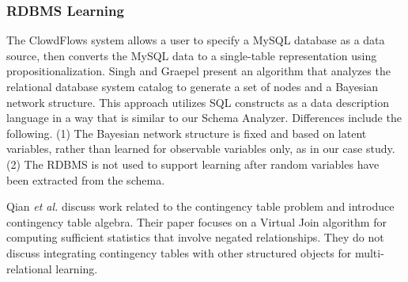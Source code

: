 \documentclass{IEEEtran}
\begin{document}
\subsubsection{RDBMS Learning}
The ClowdFlows system \cite{Lavravc2014} allows a user to specify a MySQL database as a data source, then converts the MySQL data to a single-table representation using propositionalization. 
Singh and Graepel \cite{Singh2013} present an algorithm that analyzes the relational database system catalog to generate a set of nodes and a Bayesian network structure. 
This approach utilizes SQL constructs as a data description language in a way that is similar to our Schema Analyzer. 
Differences include the following. (1) The Bayesian network structure is fixed and based on latent variables, rather than learned for observable variables only, as in our case study. (2) The RDBMS is not used to support learning after random variables have been extracted from the schema. 

Qian {\em et al.} \cite{Qian2014a}  discuss work related to the contingency table problem and introduce contingency table algebra. Their paper focuses on a Virtual Join algorithm for computing sufficient statistics that involve negated relationships. They do not discuss integrating contingency tables with other structured objects for multi-relational learning. 
%
\end{document}
